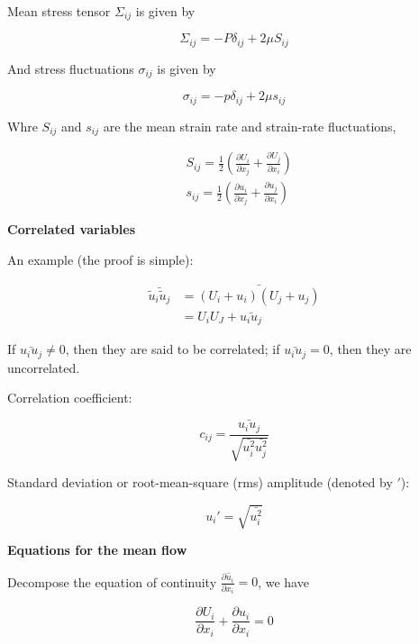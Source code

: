 \documentclass{article}
\begin{document}
Mean stress tensor $\Sigma_{ij}$ is given by

\begin{equation*}
    \Sigma_{ij}=-P\delta_{ij}+2\mu S_{ij}
\end{equation*}

And stress fluctuations $\sigma_{ij}$ is given by

\begin{equation*}
    \sigma_{ij}=-p\delta_{ij}+2\mu s_{ij}
\end{equation*}

Whre $S_{ij}$ and $s_{ij}$ are the mean strain rate and strain-rate fluctuations,

\begin{align*}
     & S_{ij}=\frac{1}{2}\left(\frac{\partial U_i}{\partial x_j}+\frac{\partial U_j}{\partial x_i}\right) \\
     & s_{ij}=\frac{1}{2}\left(\frac{\partial u_i}{\partial x_j}+\frac{\partial u_j}{\partial x_i}\right)
\end{align*}

\textbf{Correlated variables}

An example (the proof is simple):

\begin{align*}
    \bar{\tilde u_i \tilde u_j} & =\bar{(U_i+u_i)(U_j+u_j)} \\
                                & =U_iU_J+\bar{u_iu_j}
\end{align*}

If $\bar{u_iu_j}\neq0$, then they are said to be correlated; if $\bar{u_iu_j}=0$, then they are uncorrelated.

Correlation coefficient:

\begin{equation*}
    c_{ij}=\frac{\bar{u_iu_j}}{\sqrt{\bar{u_i^2}\bar{u_j^2}}}
\end{equation*}

Standard deviation or root-mean-square (rms) amplitude (denoted by $'$):

\begin{equation*}
    u_i'=\sqrt{\bar{u_i^2}}
\end{equation*}

\textbf{Equations for the mean flow}

Decompose the equation of continuity $\frac{\partial \tilde{u_i}}{\partial x_i}=0$, we have

\begin{equation*}
    \frac{\partial U_i}{\partial x_i}+\frac{\partial u_i}{\partial x_i}=0
\end{equation*}
\end{document}
